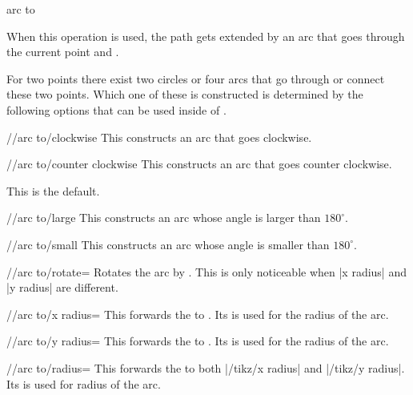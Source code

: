 \begin{pathoperation}{arc to}{}
\begin{multicols}{2}
When this operation is used, the path gets extended by an arc that goes through
the current point and .

For two points there exist two circles or four arcs that go through or connect
these two points. Which one of these is constructed is determined by the following
options that can be used inside of .

\begin{stylekey}{/\tikzext/arc to/clockwise}
  This constructs an arc that goes clockwise.
\end{stylekey}

\begin{stylekey}{/\tikzext/arc to/counter clockwise}
  This constructs an arc that goes counter clockwise.
  
  This is the default.
\end{stylekey}

\begin{stylekey}{/\tikzext/arc to/large}
  This constructs an arc whose angle is larger than $180^\circ$.
\end{stylekey}

\begin{stylekey}{/\tikzext/arc to/small}
  This constructs an arc whose angle is smaller than $180^\circ$.
\end{stylekey}

\begin{key}{/\tikzext/arc to/rotate=}
  Rotates the arc by .
  This is only noticeable when |x radius| and |y radius| are different.
\end{key}

\begin{key}{/\tikzext/arc to/x radius=}
  This forwards the  to .
  Its  is used for the radius of the arc.
\end{key}

\begin{key}{/\tikzext/arc to/y radius=}
  This forwards the  to .
  Its  is used for the radius of the arc.
\end{key}

\begin{key}{/\tikzext/arc to/radius=}
  This forwards the  to both |/tikz/x radius| and |/tikz/y radius|.
  Its  is used for radius of the arc.
\end{key}


\end{multicols}
\end{pathoperation}
